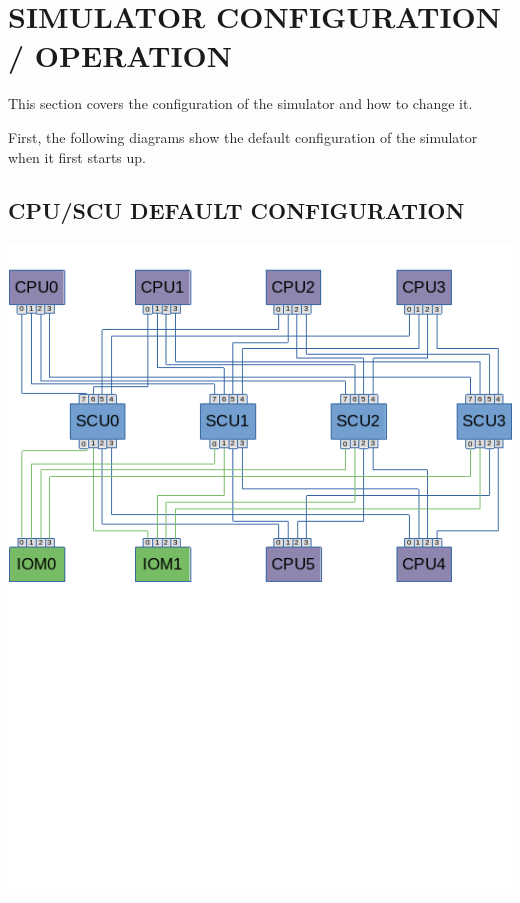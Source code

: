 \section[Simulator Configuration / Operation]{SIMULATOR CONFIGURATION / OPERATION}

This section covers the configuration of the simulator and how to change it.

First, the following diagrams show the default configuration of the simulator
when it first starts up.

\subsection[CPU/SCU Default Configuration]{CPU/SCU DEFAULT CONFIGURATION}
\begin{center}
    \includegraphics{DefaultCablingDiagram-cpu.png}
\end{center}

